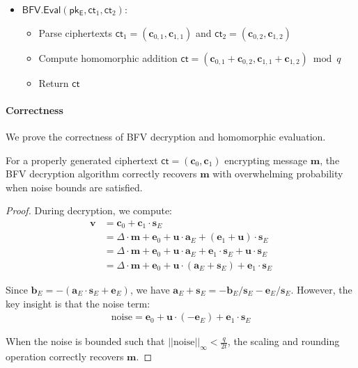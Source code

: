 \begin{itemize}
\item $\mathsf{BFV.Eval}(\mathsf{pk_E}, \mathsf{ct}_1, \mathsf{ct}_2)$:
   \begin{itemize}
       \item Parse ciphertexts $\mathsf{ct}_1 = (\mathbf{c}_{0,1}, \mathbf{c}_{1,1})$ and $\mathsf{ct}_2 = (\mathbf{c}_{0,2}, \mathbf{c}_{1,2})$
       \item Compute homomorphic addition $\mathsf{ct} = (\mathbf{c}_{0,1} + \mathbf{c}_{0,2}, \mathbf{c}_{1,1} + \mathbf{c}_{1,2}) \bmod q$
       \item Return $\mathsf{ct}$
   \end{itemize}
\end{itemize}

\paragraph{Correctness}
We prove the correctness of BFV decryption and homomorphic evaluation.

\begin{theorem}
For a properly generated ciphertext $\mathsf{ct} = (\mathbf{c}_0, \mathbf{c}_1)$ encrypting message $\mathbf{m}$, the BFV decryption algorithm correctly recovers $\mathbf{m}$ with overwhelming probability when noise bounds are satisfied.
\end{theorem}

\begin{proof}
During decryption, we compute:
\begin{align*}
\mathbf{v} &= \mathbf{c}_0 + \mathbf{c}_1 \cdot \mathbf{s}_E \\
&= \Delta \cdot \mathbf{m} + \mathbf{e}_0 + \mathbf{u} \cdot \mathbf{a}_E + (\mathbf{e}_1 + \mathbf{u}) \cdot \mathbf{s}_E \\
&= \Delta \cdot \mathbf{m} + \mathbf{e}_0 + \mathbf{u} \cdot \mathbf{a}_E + \mathbf{e}_1 \cdot \mathbf{s}_E + \mathbf{u} \cdot \mathbf{s}_E \\
&= \Delta \cdot \mathbf{m} + \mathbf{e}_0 + \mathbf{u} \cdot (\mathbf{a}_E + \mathbf{s}_E) + \mathbf{e}_1 \cdot \mathbf{s}_E
\end{align*}

Since $\mathbf{b}_E = -(\mathbf{a}_E \cdot \mathbf{s}_E + \mathbf{e}_E)$, we have $\mathbf{a}_E + \mathbf{s}_E = -\mathbf{b}_E/\mathbf{s}_E - \mathbf{e}_E/\mathbf{s}_E$. However, the key insight is that the noise term:
\begin{align*}
\text{noise} = \mathbf{e}_0 + \mathbf{u} \cdot (-\mathbf{e}_E) + \mathbf{e}_1 \cdot \mathbf{s}_E
\end{align*}

When the noise is bounded such that $||\text{noise}||_\infty < \frac{q}{2t}$, the scaling and rounding operation correctly recovers $\mathbf{m}$.
\end{proof}


